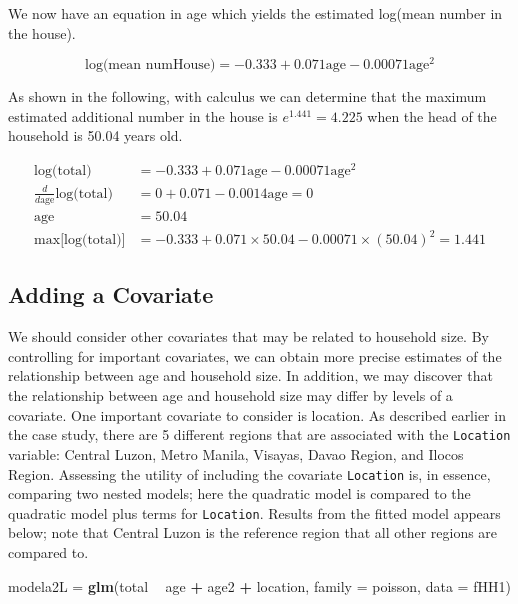 \documentclass[
]{krantz}
\newenvironment{Shaded}{\begin{snugshade}}{\end{snugshade}}
\newcommand{\DataTypeTok}[1]{\textcolor[rgb]{0.27,0.27,0.27}{#1}}
\newcommand{\KeywordTok}[1]{\textcolor[rgb]{0.27,0.27,0.27}{\textbf{#1}}}
\newcommand{\NormalTok}[1]{#1}
\newcommand{\OperatorTok}[1]{\textcolor[rgb]{0.43,0.43,0.43}{\textbf{#1}}}
\newcommand{\StringTok}[1]{\textcolor[rgb]{0.5,0.5,0.5}{#1}}
\begin{document}
We now have an equation in age which yields the estimated log(mean number in the house).

\[\textrm{log(mean numHouse)} =  -0.333 + 0.071 \textrm{age} - 0.00071 \textrm{age}^2\]

As shown in the following, with calculus we can determine that the maximum estimated additional number in the house is \(e^{1.441} = 4.225\) when the head of the household is 50.04 years old.

\begin{align*}
\textrm{log(total)} & = -0.333 + 0.071\textrm{age} - 0.00071 \textrm{age}^2 \\
\frac{d}{d\textrm{age}}\textrm{log(total)} & = 0 + 0.071 - 0.0014 \textrm{age} = 0 \\
\textrm{age} & = 50.04 \\
\textrm{max[log(total)]} & = -0.333 + 0.071 \times 50.04 - 0.00071 \times (50.04)^2 = 1.441
\end{align*}

\hypertarget{adding-a-covariate}{%
\subsection{Adding a Covariate}\label{adding-a-covariate}}

We should consider other covariates that may be related to household size. By controlling for important covariates, we can obtain more precise estimates of the relationship between age and household size. In addition, we may discover that the relationship between age and household size may differ by levels of a covariate. One important covariate to consider is location. As described earlier in the case study, there are 5 different regions that are associated with the \texttt{Location} variable: Central Luzon, Metro Manila, Visayas, Davao Region, and Ilocos Region. Assessing the utility of including the covariate \texttt{Location} is, in essence, comparing two nested models; here the quadratic model is compared to the quadratic model plus terms for \texttt{Location}. Results from the fitted model appears below; note that Central Luzon is the reference region that all other regions are compared to.

\begin{Shaded}
\begin{Highlighting}[]
\NormalTok{modela2L =}\StringTok{ }\KeywordTok{glm}\NormalTok{(total }\OperatorTok{~}\StringTok{ }\NormalTok{age }\OperatorTok{+}\StringTok{ }\NormalTok{age2 }\OperatorTok{+}\StringTok{ }\NormalTok{location, }
               \DataTypeTok{family =}\NormalTok{ poisson, }\DataTypeTok{data =}\NormalTok{ fHH1)}
\end{Highlighting}
\end{Shaded}
\end{document}
